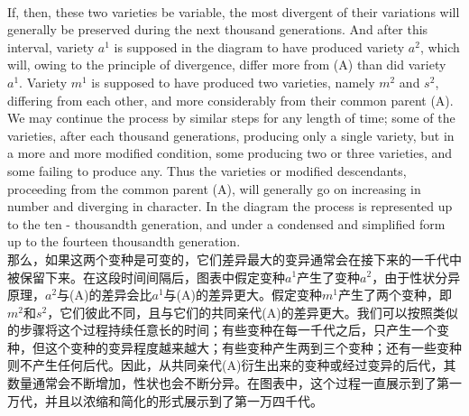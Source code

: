 \documentclass{article}
\begin{document}
\\
If, then, these two varieties be variable, the most divergent of their variations will generally be preserved during the next thousand generations. And after this interval, variety $a^1$ is supposed in the diagram to have produced variety $a^2$, which will, owing to the principle of divergence, differ more from (A) than did variety $a^1$. Variety $m^1$ is supposed to have produced two varieties, namely $m^2$ and $s^2$, differing from each other, and more considerably from their common parent (A). We may continue the process by similar steps for any length of time; some of the varieties, after each thousand generations, producing only a single variety, but in a more and more modified condition, some producing two or three varieties, and some failing to produce any. Thus the varieties or modified descendants, proceeding from the common parent (A), will generally go on increasing in number and diverging in character. In the diagram the process is represented up to the ten - thousandth generation, and under a condensed and simplified form up to the fourteen thousandth generation.\\
那么，如果这两个变种是可变的，它们差异最大的变异通常会在接下来的一千代中被保留下来。在这段时间间隔后，图表中假定变种$a^1$产生了变种$a^2$，由于性状分异原理，$a^2$与(A)的差异会比$a^1$与(A)的差异更大。假定变种$m^1$产生了两个变种，即$m^2$和$s^2$，它们彼此不同，且与它们的共同亲代(A)的差异更大。我们可以按照类似的步骤将这个过程持续任意长的时间；有些变种在每一千代之后，只产生一个变种，但这个变种的变异程度越来越大；有些变种产生两到三个变种；还有一些变种则不产生任何后代。因此，从共同亲代(A)衍生出来的变种或经过变异的后代，其数量通常会不断增加，性状也会不断分异。在图表中，这个过程一直展示到了第一万代，并且以浓缩和简化的形式展示到了第一万四千代。 \\
\end{document}
